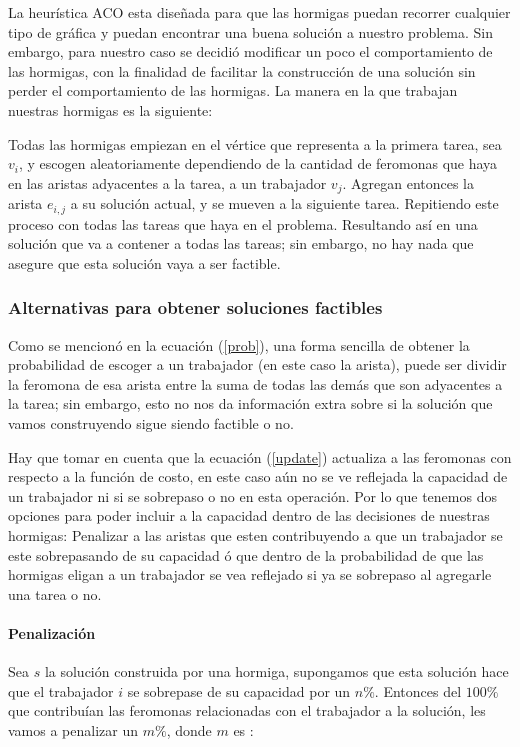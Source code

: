 \documentclass{article}
\begin{document}
    La heurística ACO esta diseñada para que las hormigas
    puedan recorrer cualquier tipo de gráfica y puedan
    encontrar una buena solución a nuestro problema. Sin 
    embargo, para nuestro caso se decidió modificar un 
    poco el comportamiento de las hormigas, con la finalidad
    de facilitar la construcción de una solución sin 
    perder el comportamiento de las hormigas. La manera 
    en la que trabajan nuestras hormigas es la siguiente:

    Todas las hormigas empiezan en el vértice que representa
    a la primera tarea, sea $v_i$, y escogen aleatoriamente
    dependiendo de la cantidad de feromonas que haya en las 
    aristas adyacentes a la tarea, a un trabajador $v_j$. 
    Agregan entonces la arista $e_{i,j}$ a su solución 
    actual, y se mueven a la siguiente tarea. Repitiendo 
    este proceso con todas las tareas que haya en el problema.
    Resultando así en una solución que va a contener a todas
    las tareas; sin embargo, no hay nada que asegure que esta 
    solución vaya a ser factible.

    \subsubsection{ Alternativas para obtener soluciones factibles }
    Como se mencionó en la ecuación (\ref{prob}), una forma 
    sencilla de obtener la probabilidad de escoger a un 
    trabajador (en este caso la arista), puede ser dividir la 
    feromona de esa arista entre la suma de todas las demás que
    son adyacentes a la tarea; sin embargo, esto no nos da 
    información extra sobre si la solución que vamos construyendo 
    sigue siendo factible o no.

    Hay que tomar en cuenta que la ecuación (\ref{update}) 
    actualiza a las feromonas con respecto a la función de costo, 
    en este caso aún no se ve reflejada la capacidad de un trabajador
    ni si se sobrepaso o no en esta operación. Por lo que tenemos
    dos opciones para poder incluir a la capacidad dentro de las 
    decisiones de nuestras hormigas: Penalizar a las aristas que 
    esten contribuyendo a que un trabajador se este sobrepasando 
    de su capacidad ó que dentro de la probabilidad de que las 
    hormigas eligan a un trabajador se vea reflejado si ya 
    se sobrepaso al agregarle una tarea o no.

    \paragraph{Penalización}
    Sea $s$ la solución construida por una hormiga, supongamos que 
    esta solución hace que el trabajador $i$ se sobrepase de su 
    capacidad por un $n \%$. Entonces del $100 \%$ que contribuían
    las feromonas relacionadas con el trabajador a la solución, les 
    vamos a penalizar un $m \%$, donde $m$ es :
\end{document}
